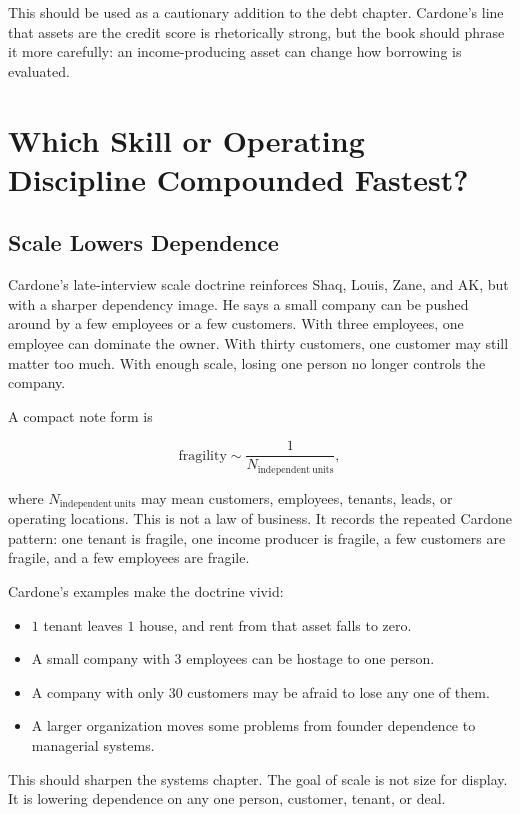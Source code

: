 \documentclass[11pt,oneside]{book}
\begin{document}
This should be used as a cautionary addition to the debt chapter. Cardone's line that assets are the credit score is rhetorically strong, but the book should phrase it more carefully: an income-producing asset can change how borrowing is evaluated.

\chapter{Which Skill or Operating Discipline Compounded Fastest?}

\section{Scale Lowers Dependence}

Cardone's late-interview scale doctrine reinforces Shaq, Louis, Zane, and AK, but with a sharper dependency image. He says a small company can be pushed around by a few employees or a few customers. With three employees, one employee can dominate the owner. With thirty customers, one customer may still matter too much. With enough scale, losing one person no longer controls the company.

A compact note form is

\begin{equation}
\mathrm{fragility}
\sim
\frac{1}{N_{\mathrm{independent\ units}}},
\end{equation}

where \(N_{\mathrm{independent\ units}}\) may mean customers, employees, tenants, leads, or operating locations. This is not a law of business. It records the repeated Cardone pattern: one tenant is fragile, one income producer is fragile, a few customers are fragile, and a few employees are fragile.

Cardone's examples make the doctrine vivid:

\begin{itemize}
\item \(1\) tenant leaves \(1\) house, and rent from that asset falls to zero.
\item A small company with \(3\) employees can be hostage to one person.
\item A company with only \(30\) customers may be afraid to lose any one of them.
\item A larger organization moves some problems from founder dependence to managerial systems.
\end{itemize}

This should sharpen the systems chapter. The goal of scale is not size for display. It is lowering dependence on any one person, customer, tenant, or deal.
\end{document}
